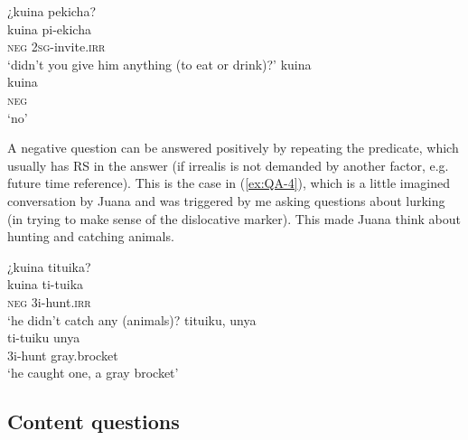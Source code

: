 \ea\label{ex:QA-new23-2}
  \ea
\begingl
\glpreamble ¿kuina pekicha?\\
\gla kuina pi-ekicha\\
\glb \textsc{neg} 2\textsc{sg}-invite.\textsc{irr} \\
\glft ‘didn’t you give him anything (to eat or drink)?'
\endgl
  \ex
\begingl
\glpreamble kuina\\
\gla kuina\\
\glb \textsc{neg}\\
\glft ‘no’
\endgl
\trailingcitation{[jmx-e090727s.179]}
\z
\xe
{}

A negative question can be answered positively by repeating the predicate, which usually has  RS in the answer (if irrealis is not demanded by another factor, e.g. future time reference). This is the case in (\ref{ex:QA-4}), which is a little imagined conversation by  Juana and was triggered by me asking questions about lurking (in trying to make sense of the dislocative marker). This made Juana think about hunting and catching animals.

\ea\label{ex:QA-4}
  \ea
\begingl
\glpreamble ¿kuina tituika? \\
\gla kuina ti-tuika\\
\glb \textsc{neg} 3i-hunt.\textsc{irr}\\
\glft ‘he didn’t catch any (animals)?
\endgl
  \ex
\begingl
\glpreamble tituiku, unya\\
\gla ti-tuiku unya\\
\glb 3i-hunt gray.brocket\\
\glft ‘he caught one, a gray brocket’
\endgl
\trailingcitation{[jxx-e110923l-1.059-060]}
\z
\xe
{}

%
%
%
%
%
%
%
%
%


\subsection{Content questions}\label{sec:ContentQuestions}


